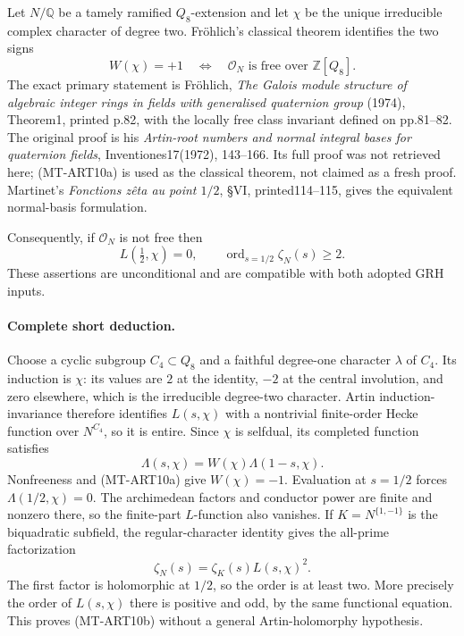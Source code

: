 \documentclass[11pt,a4paper]{article}
\begin{document}
Let $N/\mathbb Q$ be a tamely ramified $Q_8$-extension and let
$\chi$ be the unique irreducible complex character of degree two.
Fr\"ohlich's classical theorem identifies the two signs
\[
 W(\chi)=+1\quad\Longleftrightarrow\quad
       \mathcal O_N\text{ is free over }\mathbb Z[Q_8].
 \tag{MT-ART10a}
\]
The exact primary statement is Fr\"ohlich, \emph{The Galois
module structure of algebraic integer rings in fields with
generalised quaternion group} (1974), Theorem1, printed p.82,
with the locally free class invariant defined on pp.81--82.
The original proof is his \emph{Artin-root numbers and normal
integral bases for quaternion fields}, Inventiones17(1972),
143--166. Its full proof was not retrieved here; (MT-ART10a)
is used as the classical theorem, not claimed as a fresh proof.
Martinet's \emph{Fonctions z\^eta au point $1/2$}, \S VI,
printed114--115, gives the equivalent normal-basis formulation.

Consequently, if $\mathcal O_N$ is not free then
\[
 L(\tfrac12,\chi)=0,
 \qquad \operatorname{ord}_{s=1/2}\zeta_N(s)\ge2.
 \tag{MT-ART10b}
\]
These assertions are unconditional and are compatible with
both adopted GRH inputs.

\paragraph{Complete short deduction.}
Choose a cyclic subgroup $C_4\subset Q_8$ and a faithful
degree-one character $\lambda$ of $C_4$. Its induction is
$\chi$: its values are $2$ at the identity, $-2$ at the central
involution, and zero elsewhere, which is the irreducible
degree-two character. Artin induction-invariance therefore
identifies $L(s,\chi)$ with a nontrivial finite-order Hecke
function over $N^{C_4}$, so it is entire. Since $\chi$ is
selfdual, its completed function satisfies
\[
                 \Lambda(s,\chi)=W(\chi)\Lambda(1-s,\chi).
\]
Nonfreeness and (MT-ART10a) give $W(\chi)=-1$. Evaluation at
$s=1/2$ forces $\Lambda(1/2,\chi)=0$. The archimedean factors
and conductor power are finite and nonzero there, so the
finite-part $L$-function also vanishes. If $K=N^{\{1,-1\}}$
is the biquadratic subfield, the regular-character identity
gives the all-prime factorization
\[
                         \zeta_N(s)=\zeta_K(s)L(s,\chi)^2.
\]
The first factor is holomorphic at $1/2$, so the order is at
least two. More precisely the order of $L(s,\chi)$ there is
positive and odd, by the same functional equation. This proves
(MT-ART10b) without a general Artin-holomorphy hypothesis.
\end{document}
